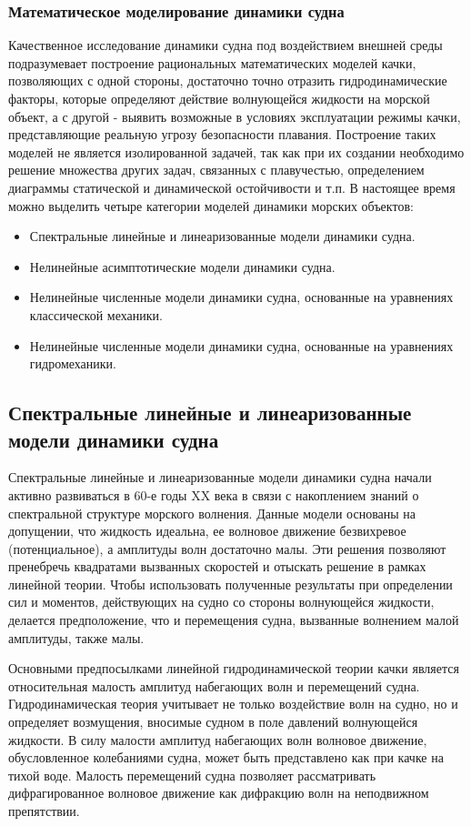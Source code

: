 \subsubsection{Математическое моделирование динамики судна}
Качественное исследование динамики судна под воздействием внешней среды подразумевает построение рациональных математических моделей качки, позволяющих с одной стороны, достаточно точно отразить гидродинамические факторы, которые определяют действие волнующейся жидкости на морской объект, а с другой - выявить возможные в условиях эксплуатации режимы качки, представляющие реальную угрозу безопасности плавания. Построение таких моделей не является изолированной задачей, так как при их создании необходимо решение множества других задач, связанных с плавучестью, определением диаграммы статической и динамической остойчивости и т.п.  В настоящее время можно выделить четыре категории моделей динамики морских объектов:
\begin{itemize}
\item	Спектральные линейные и линеаризованные модели динамики судна.
\item	Нелинейные асимптотические модели динамики судна.
\item	Нелинейные численные модели динамики судна, основанные на уравнениях классической механики.
\item	Нелинейные численные модели динамики судна, основанные на уравнениях гидромеханики.
\end{itemize}

\subsection{Спектральные линейные и линеаризованные модели динамики судна}
Спектральные линейные и линеаризованные модели динамики судна начали активно развиваться в 60-е годы XX века в связи с накоплением знаний о спектральной структуре морского волнения. Данные модели основаны на допущении, что жидкость идеальна, ее волновое движение безвихревое (потенциальное), а амплитуды волн достаточно малы. Эти решения позволяют пренебречь квадратами вызванных скоростей и отыскать решение в рамках линейной теории. Чтобы использовать полученные результаты при определении сил и моментов, действующих на судно со стороны волнующейся жидкости, делается предположение, что и перемещения судна, вызванные волнением малой амплитуды, также малы.

Основными предпосылками линейной гидродинамической теории качки является относительная малость амплитуд набегающих волн и перемещений судна. Гидродинамическая теория учитывает не только воздействие волн на судно, но и определяет возмущения, вносимые судном в поле давлений волнующейся жидкости. В силу малости амплитуд набегающих волн волновое движение, обусловленное колебаниями судна, может быть представлено как при качке на тихой воде. Малость перемещений судна позволяет рассматривать дифрагированное волновое движение как дифракцию волн на неподвижном препятствии.

